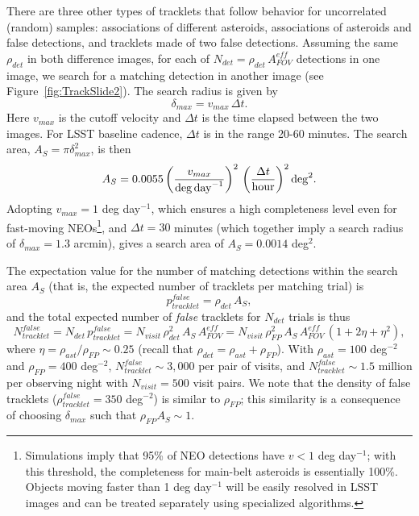 There are three other types of tracklets that follow behavior for uncorrelated (random)
samples: associations of different asteroids, associations of asteroids and false detections,
and tracklets made of two false detections. Assuming the same $\rho_{det}$ in both
difference images, for each of $N_{det} = \rho_{det} \, A_{FOV}^{eff}$ detections in one image,
we search for a matching detection in another image (see Figure~\ref{fig:TrackSlide2}).
The search radius is given by
\begin{equation}
                     \delta_{max} = v_{max} \, \Delta t .
\end{equation}
Here $v_{max}$ is the  cutoff velocity and $\Delta t$
is the time elapsed between the two images. For LSST baseline cadence, $\Delta t$ is in
the range 20-60 minutes. The search area, $A_S = \pi \delta_{max}^2$, is then
\begin{equation}
\label{eq:AS}
      A_S = 0.0055 \left( v_{max}  \over {\rm deg \, day}^{-1} \right)^2 \, \left(\Delta t \over {\rm hour} \right)^2 {\rm deg}^2.
\end{equation}
Adopting $v_{max} = 1$ deg day$^{-1}$, which ensures a high completeness level even for fast-moving
NEOs\footnote{Simulations imply that 95\% of NEO detections have $v<1$ deg day$^{-1}$; with this threshold,
the completeness for main-belt asteroids is essentially 100\%. Objects moving faster than 1 deg day$^{-1}$ will
be easily resolved in LSST images and can be treated separately using specialized algorithms.}, and $\Delta t = 30$
minutes (which together  imply a search radius of $\delta_{max} = 1.3$ arcmin), gives a search area of
$A_S = 0.0014$ deg$^2$.


The expectation value for the number of matching detections within the search area $A_S$ (that is, the expected
number of tracklets per matching trial) is
\begin{equation}
                      p_{tracklet}^{false} =   \rho_{det}  \, A_S,
\end{equation}
and the total expected number of {\it false} tracklets for $N_{det}$ trials is thus
\begin{equation}
\label{eq:NttFalse}
           N_{tracklet}^{false} = N_{det} \, p_{tracklet}^{false} =  N_{visit} \, \rho_{det}^2 \, A_S \, A_{FOV}^{eff} = N_{visit} \, \rho^2_{FP}  \, A_S \, A_{FOV}^{eff} \,  \left(1 + 2 \eta + \eta^2\right),
\end{equation}
where $\eta = \rho_{ast}  / \rho_{FP} \sim 0.25$ (recall that $\rho_{det} = \rho_{ast} + \rho_{FP}$).
With $\rho_{ast} = 100$ deg$^{-2}$ and  $\rho_{FP} = 400$ deg$^{-2}$,
$N_{tracklet}^{false} \sim 3,000$ per pair of visits, and $N_{tracklet}^{false} \sim 1.5$ million per observing night with
$N_{visit}=500$ visit pairs. We note that the density of false tracklets ($\rho_{tracklet}^{false}=350$ deg$^{-2}$) is similar to
$\rho_{FP}$; this similarity is a consequence of choosing $\delta_{max}$ such that $\rho_{FP} A_S \sim 1$.

